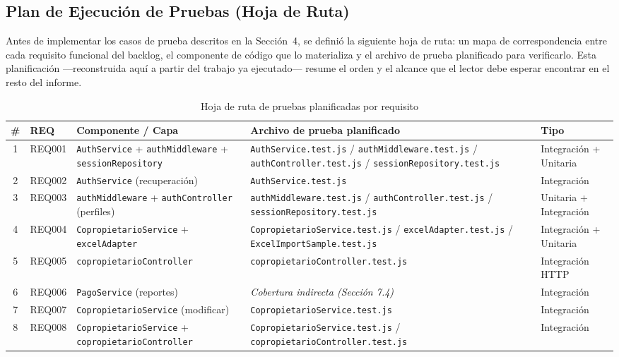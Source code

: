 \documentclass[12pt,a4paper]{article}
\begin{document}
\subsection{Plan de Ejecución de Pruebas (Hoja de Ruta)}

Antes de implementar los casos de prueba descritos en la Sección~4, se definió la
siguiente hoja de ruta: un mapa de correspondencia entre cada requisito funcional del
backlog, el componente de código que lo materializa y el archivo de prueba planificado
para verificarlo. Esta planificación —reconstruida aquí a partir del trabajo ya
ejecutado— resume el orden y el alcance que el lector debe esperar encontrar en el
resto del informe.

\begin{table}[H]
\centering
\caption{Hoja de ruta de pruebas planificadas por requisito}
\label{tab:hoja-ruta}
\begin{tabular}{clp{3.7cm}p{3.6cm}l}
\toprule
\textbf{\#} & \textbf{REQ} & \textbf{Componente / Capa} & \textbf{Archivo de prueba planificado} & \textbf{Tipo} \\
\midrule
1  & REQ001 & \texttt{AuthService} + \texttt{authMiddleware} + \texttt{sessionRepository} & \texttt{AuthService.test.js} / \texttt{authMiddleware.test.js} / \texttt{authController.test.js} / \texttt{sessionRepository.test.js} & Integración + Unitaria \\
2  & REQ002 & \texttt{AuthService} (recuperación) & \texttt{AuthService.test.js} & Integración \\
3  & REQ003 & \texttt{authMiddleware} + \texttt{authController} (perfiles) & \texttt{authMiddleware.test.js} / \texttt{authController.test.js} / \texttt{sessionRepository.test.js} & Unitaria + Integración \\
4  & REQ004 & \texttt{CopropietarioService} + \texttt{excelAdapter} & \texttt{CopropietarioService.test.js} / \texttt{excelAdapter.test.js} / \texttt{ExcelImportSample.test.js} & Integración + Unitaria \\
5  & REQ005 & \texttt{copropietarioController} & \texttt{copropietarioController.test.js} & Integración HTTP \\
6  & REQ006 & \texttt{PagoService} (reportes) & \emph{Cobertura indirecta (Sección 7.4)} & Integración \\
7  & REQ007 & \texttt{CopropietarioService} (modificar) & \texttt{CopropietarioService.test.js} & Integración \\
8  & REQ008 & \texttt{CopropietarioService} + \texttt{copropietarioController} & \texttt{CopropietarioService.test.js} / \texttt{copropietarioController.test.js} & Integración \\

\end{tabular}
\end{table}
\end{document}
